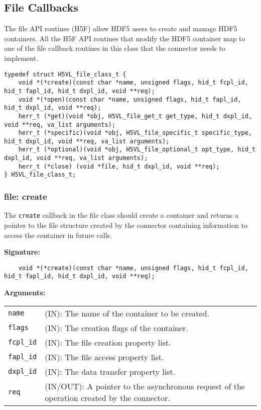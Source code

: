 

\subsection{File Callbacks}
The file API routines (H5F) allow HDF5 users to create and manage HDF5
containers. All the H5F API routines that modify the HDF5 container
map to one of the file callback routines in this class that the connector
needs to implement.

\begin{lstlisting}[caption={File class for file API routines, H5VLconnector.h}, captionpos=b, label={lst:Fileclass}]
typedef struct H5VL_file_class_t {                                               
    void *(*create)(const char *name, unsigned flags, hid_t fcpl_id, hid_t fapl_id, hid_t dxpl_id, void **req);                   
    void *(*open)(const char *name, unsigned flags, hid_t fapl_id, hid_t dxpl_id, void **req);
    herr_t (*get)(void *obj, H5VL_file_get_t get_type, hid_t dxpl_id, void **req, va_list arguments);
    herr_t (*specific)(void *obj, H5VL_file_specific_t specific_type, hid_t dxpl_id, void **req, va_list arguments);            
    herr_t (*optional)(void *obj, H5VL_file_optional_t opt_type, hid_t dxpl_id, void **req, va_list arguments);
    herr_t (*close) (void *file, hid_t dxpl_id, void **req);
} H5VL_file_class_t; 
\end{lstlisting}


\subsubsection{file: create}
The \texttt{create} callback in the file class should create a container
and returns a pointer to the file structure created by the connector containing information to
access the container in future calls.\medskip

\begin{mdframed}[style=bgbox]
\textbf{Signature:}
\begin{lstlisting}
    void *(*create)(const char *name, unsigned flags, hid_t fcpl_id, hid_t fapl_id, hid_t dxpl_id, void **req);
\end{lstlisting}

\textbf{Arguments:}\\
\begin{tabular}{l p{13.5cm}}
  \texttt{name} & (IN): The name of the container to be created.\\
  \texttt{flags} & (IN): The creation flags of the container.\\
  \texttt{fcpl\_id} & (IN): The file creation property list.\\
  \texttt{fapl\_id} & (IN): The file access property list.\\
  \texttt{dxpl\_id} & (IN): The data transfer property list.\\
  \texttt{req} & (IN/OUT): A pointer to the asynchronous request of the
  operation created by the connector.\\
\end{tabular}
\end{mdframed}

